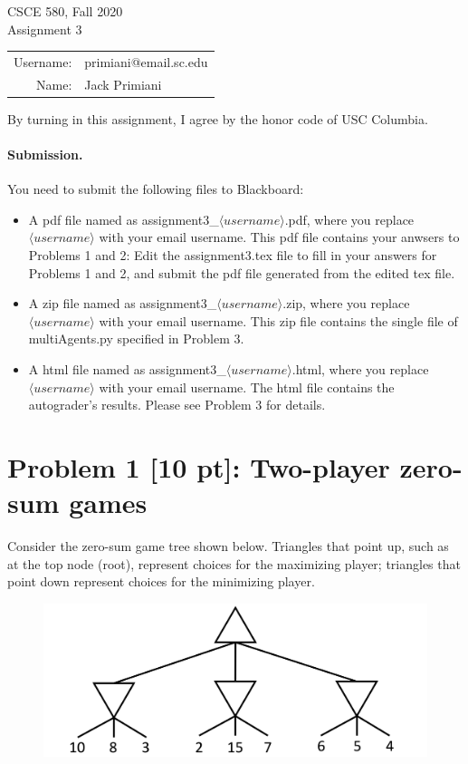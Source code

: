 \documentclass[12pt]{article}
\theoremstyle{case}
\begin{document}
\begin{center}
{\Large CSCE 580, Fall 2020 \\ Assignment 3}

\begin{tabular}{rl}
Username: & primiani@email.sc.edu \\
Name: & Jack Primiani \\
\end{tabular}
\end{center}

By turning in this assignment, I agree by the honor code of USC Columbia.

\paragraph{Submission.}
You need to submit the following files to Blackboard:
\begin{itemize}
    \item A pdf file named as assignment3\_$\langle username \rangle$.pdf, where you replace $\langle username \rangle$ with your email username. This pdf file contains your anwsers to Problems 1 and 2: Edit the assignment3.tex file to fill in your answers for Problems 1 and 2, and submit the pdf file generated from the edited tex file. 
    \item A zip file named as assignment3\_$\langle username \rangle$.zip, where you replace $\langle username \rangle$ with your email username.
    This zip file contains the single file of multiAgents.py specified in Problem 3.
    \item A html file named as assignment3\_$\langle username \rangle$.html, where you replace $\langle username \rangle$ with your email username. The html file contains the autograder's results. Please see Problem 3 for details.
\end{itemize}

\section*{Problem 1 [10 pt]: Two-player zero-sum games}
Consider the zero-sum game tree shown below. Triangles that point up, such as at the top node (root), represent choices for the maximizing player; triangles that point down represent choices for the minimizing player.
\begin{figure}[h]
\includegraphics[width=.7\textwidth]{assignment3_1.jpg}
\centering
\end{figure}
 
\end{document}
